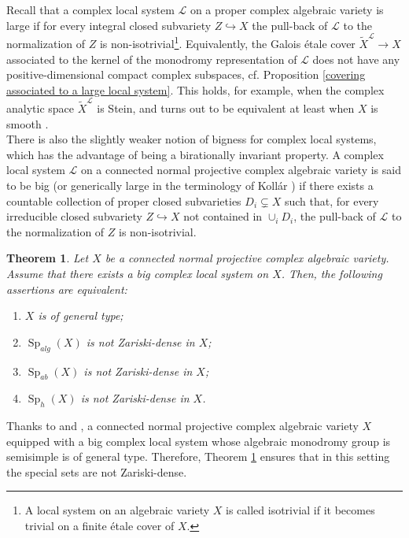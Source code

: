 \documentclass[11pt,letterpaper]{amsart}
\def\cL{\mathcal{L}}
\theoremstyle{plain}
\newtheorem{thmintro}{Theorem}
\DeclareMathOperator{\Sp}{Sp}
\begin{document}
Recall that a complex local system $\cL$ on a proper complex algebraic variety is large if for every integral closed subvariety $Z \hookrightarrow X$ the pull-back of $\cL$ to the normalization of $Z$ is non-isotrivial\footnote{A local system on an algebraic variety $X$ is called isotrivial if it becomes trivial on a finite étale cover of $X$.}. Equivalently, the Galois \'etale cover $\tilde{X}^\cL \to X$ associated to the kernel of the monodromy representation of $\cL$ does not have any positive-dimensional compact complex subspaces, cf. Proposition \ref{covering associated to a large local system}. This holds, for example, when the complex analytic space $ \tilde{X}^\cL$ is Stein, and turns out to be equivalent at least when $X$ is smooth \cite{Eyssidieux-reductive, EKPR}. \\

There is also the slightly weaker notion of bigness for complex local systems, which has the advantage of being a birationally invariant property. A complex local system $\cL$ on a connected normal projective complex algebraic variety is said to be big (or generically large in the terminology of Koll\'ar \cite{Kollar-Shafarevich}) if there exists a countable collection of proper closed subvarieties $D_i \subsetneq X$ such that, for every irreducible closed subvariety $Z \hookrightarrow X$ not contained in $\cup_i D_i$, the pull-back of $\cL$ to the normalization of $Z$ is non-isotrivial.


\begin{thmintro}\label{Lang for big}
Let $X$ be a connected normal projective complex algebraic variety. Assume that there exists a big complex local system on $X$. Then, the following assertions are equivalent:
\begin{enumerate}
\item $X$ is of general type;
\item $\Sp_{alg}(X)$ is not Zariski-dense in $X$; 
\item $\Sp_{ab}(X)$ is not Zariski-dense in $X$;
\item $\Sp_{h}(X)$ is not Zariski-dense in $X$.
\end{enumerate}     
\end{thmintro}

Thanks to \cite[Theorem 1]{Zuo-Chern-hyperbolicity} and \cite[Theorem 1]{CCE}, a connected normal projective complex algebraic variety $X$ equipped with a big complex local system whose algebraic monodromy group is semisimple is of general type. Therefore, Theorem \ref{Lang for big} ensures that in this setting the special sets are not Zariski-dense. \\
\end{document}
